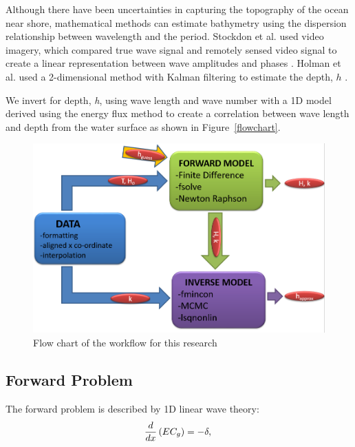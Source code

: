 
Although there have been uncertainties in capturing the topography of the ocean near shore, mathematical methods can estimate bathymetry using the dispersion relationship between wavelength and the period. Stockdon et al. used video imagery, which compared true wave signal and remotely sensed video signal to create a linear representation between wave amplitudes and phases \citep{stockdon2000}.  Holman et al. used a 2-dimensional method with Kalman filtering to estimate the depth, $h$ \citep{holman2013}.

We invert for depth, \textit{h}, using wave length and wave number with a 1D model derived using the energy flux method to create a correlation between wave length and depth from the water surface as shown in Figure~\ref{flowchart}.

\begin{figure}[h]
		\centering
		\includegraphics[width=.40\linewidth]{img/Flow_Chart.png}
		\caption{Flow chart of the workflow for this research}
		\label{AWAC}
\end{figure}

\subsection{Forward Problem}\label{forwardproblem}

The forward problem is described by 1D linear wave theory:
\begin{equation}\label{eqn:model}
\frac{d}{dx}\left(EC_g\right)=-\delta,\\
\end{equation}

